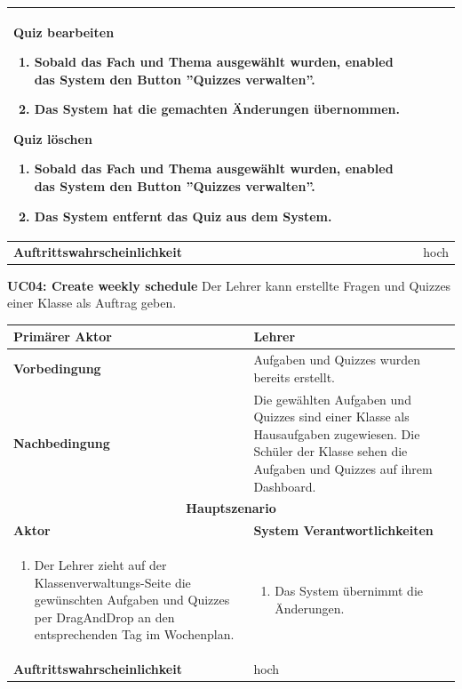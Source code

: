 \begin{tabularx}{\textwidth}{| X | X |}
		\textbf{Quiz bearbeiten}
		\begin{enumerate}
			\item Sobald das Fach und Thema ausgewählt wurden, enabled das System den Button ''Quizzes verwalten''.
			\item Das System hat die gemachten Änderungen übernommen.
		\end{enumerate}		
		
		\textbf{Quiz löschen}
		\begin{enumerate}
			\item Sobald das Fach und Thema ausgewählt wurden, enabled das System den Button ''Quizzes verwalten''.
			\item Das System entfernt das Quiz aus dem System.
		\end{enumerate}	
		\\
	\hline
		\textbf{Auftrittswahrscheinlichkeit} & hoch \\
	\hline
\end{tabularx}


\textbf{UC04: Create weekly schedule} Der Lehrer kann erstellte Fragen und Quizzes einer Klasse als Auftrag geben. 

\begin{tabularx}{\textwidth}{| X | X |}
	\hline
		\textbf{Primärer Aktor} & Lehrer \\
	\hline
		\textbf{Vorbedingung} & Aufgaben und Quizzes wurden bereits erstellt. \\
	\hline
		\textbf{Nachbedingung} & Die gewählten Aufgaben und Quizzes sind einer Klasse als Hausaufgaben zugewiesen. Die Schüler der Klasse sehen die Aufgaben und Quizzes auf ihrem Dashboard. \\
	\hline
		\multicolumn{2}{|c|}{\textbf{Hauptszenario}} \\
	\hline
		\textbf{Aktor} & \textbf{System Verantwortlichkeiten} \\
	\hline
		\begin{enumerate}
			\item Der Lehrer zieht auf der Klassenverwaltungs-Seite die gewünschten Aufgaben und Quizzes per DragAndDrop an den entsprechenden Tag im Wochenplan. 
		\end{enumerate}
			& 
		\begin{enumerate}
			\item Das System übernimmt die Änderungen.
		\end{enumerate} 
		\\
	\hline
		\textbf{Auftrittswahrscheinlichkeit} & hoch \\
	\hline
\end{tabularx}


